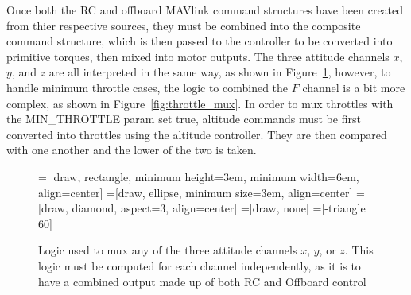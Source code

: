 \documentclass[paper=a4, fontsize=11pt]{scrartcl} %
\begin{document}
Once both the RC and offboard MAVlink command structures have been created from thier respective sources, they must be combined into the composite command structure, which is then passed to the controller to be converted into primitive torques, then mixed into motor outputs.  The three attitude channels $x$, $y$, and $z$ are all interpreted in the same way, as shown in Figure~\ref{fig:attitude_mux}, however, to handle minimum throttle cases, the logic to combined the $F$ channel is a bit more complex, as shown in Figure~\ref{fig:throttle_mux}.  In order to mux throttles with the MIN\_THROTTLE param set true, altitude commands must be first converted into throttles using the altitude controller.  They are then compared with one another and the lower of the two is taken.

\begin{figure}
\centering
	 = [draw, rectangle, 
    					minimum height=3em, minimum width=6em, align=center]
  =[draw, ellipse, minimum size=3em,
    					align=center]
  =[draw, diamond, aspect=3, align=center]
  =[draw, none]
  =[-triangle 60]

  \begin{adjustbox}{max size={\textwidth}{\textheight}}
  \end{adjustbox}

  \label{fig:attitude_mux}
  \caption{Logic used to mux any of the three attitude channels $x$, $y$, or $z$.  This logic must be computed for each channel independently, as it is to have a combined output made up of both RC and Offboard control}
\end{figure}
\end{document}
